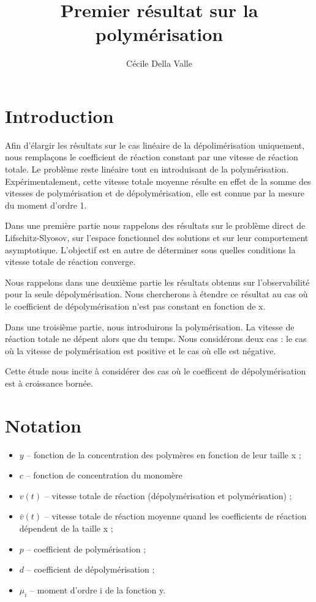 \documentclass[a4paper]{article}
\title{Premier résultat sur la polymérisation}
\author{Cécile Della Valle}
\theoremstyle{definition}
\theoremstyle{remark}
\newcommand{\pol}{p}
\newcommand{\dep}{d}
\begin{document}
\maketitle

\section{Introduction}

Afin d'élargir les résultats sur le cas linéaire de la dépolimérisation uniquement, 
nous remplaçons le coefficient de réaction constant par une vitesse de réaction totale. 
Le problème reste linéaire tout en introduisant de la polymérisation. Expérimentalement, 
cette vitesse totale moyenne résulte en effet de la somme des vitesses de polymérisation et de dépolymérisation, 
elle est connue par la mesure du moment d'ordre 1. 

Dans une première partie nous rappelons des résultats sur le problème direct de Lifschitz-Slyosov, 
sur l'espace fonctionnel des solutions et sur leur comportement asymptotique. 
L'objectif est en autre de déterminer sous quelles conditions la vitesse totale de réaction converge.

Nous rappelons dans une deuxième partie les résultats obtenus sur l'observabilité pour la seule dépolymérisation. 
Nous chercherons à étendre ce résultat  au cas où le coefficient de dépolymérisation n'est pas constant en fonction de x.

Dans une troisième partie, nous introduirons la polymérisation. 
La vitesse de réaction totale ne dépent alors que du temps. 
Nous considérons deux cas : le cas où la vitesse de polymérisation est positive et le cas où elle est négative.

Cette étude nous incite à considérer des cas où le coefficent de dépolymérisation est à croissance bornée.


\section{Notation}

\begin{itemize}
\item $y$ -- fonction de la concentration des polymères en fonction de leur taille x ;
\item $c$ -- fonction de concentration du monomère
\item $v(t)$ -- vitesse totale de réaction (dépolymérisation et polymérisation) ;
\item $\bar{v}(t)$ -- vitesse totale de réaction moyenne quand les coefficients de réaction dépendent de la taille x ;
\item $\pol$ -- coefficient de polymérisation ;
\item $\dep$ -- coefficient de dépolymérisation ;
\item $\mu_i$ -- moment d'ordre i de la fonction y.
\end{itemize}
\end{document}
